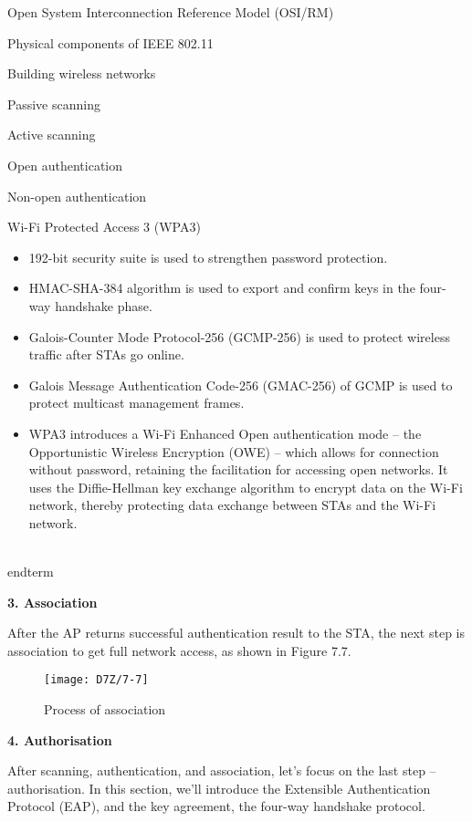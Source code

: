 \documentclass[a4paper,12pt]{book}
\begin{document}
\begin{term}{Open System Interconnection Reference Model (OSI/RM)}
\begin{term}{Physical components of IEEE 802.11}
\begin{term}{Building wireless networks}
\begin{term}{Passive scanning}
\begin{term}{Active scanning}
\begin{term}{Open authentication}
\begin{term}{Non-open authentication}
\begin{secterm}{Wi-Fi Protected Access 3 (WPA3)}
\begin{itemize}
            First, SAE denies services for STAs that repeatedly try to connect to the AP, preventing brute-force attacks or password cracking. Second, its forward secrecy function ensures that the key will be changed frequently and automatically, so that even if the most recent key is hacked, only a minimal amount of data will be exposed. Last, SAE considers devices as peers. Either party can initiate a handshake and send authentication information independently, cancelling the message exchange process, thus leaving no opportunity for KRACKs.
            \item 192-bit security suite is used to strengthen password protection.
            \item HMAC-SHA-384 algorithm is used to export and confirm keys in the four-way handshake phase.
            \item Galois-Counter Mode Protocol-256 (GCMP-256) is used to protect wireless traffic after STAs go online.
            \item Galois Message Authentication Code-256 (GMAC-256) of GCMP is used to protect multicast management frames.
            \item WPA3 introduces a Wi-Fi Enhanced Open authentication mode – the Opportunistic Wireless Encryption (OWE) – which allows for connection without password, retaining the facilitation for accessing open networks. It uses the Diffie-Hellman key exchange algorithm to encrypt data on the Wi-Fi network, thereby protecting data exchange between STAs and the Wi-Fi network.
        \end{itemize}
    \end{secterm}
\\end{term}{}

\textbf{3. Association}

After the AP returns successful authentication result to the STA, the next step is association to get full network access, as shown in Figure 7.7.

\begin{figure}[!h]
    \centering
    \texttt{[image: D7Z/7-7]}
    \caption{Process of association}
\end{figure}

\textbf{4. Authorisation}

After scanning, authentication, and association, let’s focus on the last step – authorisation. In this section, we’ll introduce the Extensible Authentication Protocol (EAP), and the key agreement, the four-way handshake protocol.


\end{term}
\end{term}
\end{term}
\end{term}
\end{term}
\end{term}
\end{term}
\end{document}
